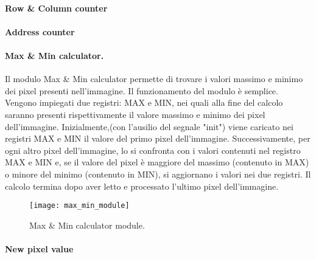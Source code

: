 \paragraph{Row \& Column counter}
\paragraph{Address counter}
\paragraph{Max \& Min calculator.}
Il modulo Max \& Min calculator permette di trovare i valori massimo e minimo dei pixel presenti nell'immagine.
Il funzionamento del modulo è semplice. Vengono impiegati due registri: MAX e MIN, nei quali alla fine del calcolo saranno presenti rispettivamente il valore massimo e minimo dei pixel dell'immagine.
Inizialmente,(con l'ausilio del segnale "init") viene caricato nei registri MAX e MIN il valore del primo pixel dell'immagine. Successivamente, per ogni altro pixel dell'immagine, lo si confronta con i valori contenuti nel registro MAX e MIN e, se il valore del pixel è maggiore del massimo (contenuto in MAX) o minore del minimo (contenuto in MIN), si aggiornano i valori nei due registri.
Il calcolo termina dopo aver letto e processato l'ultimo pixel dell'immagine.

\begin{figure}[h!] %
  \texttt{[image: max\_min\_module]}
  \caption{Max \& Min calculator module.}
  \label{fig:maxMin}
\end{figure}

\paragraph{New pixel value}
